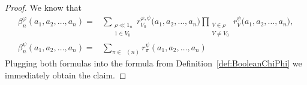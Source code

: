 \documentclass[12pt]{amsart}
\DeclareMathOperator{\IntPart}{\mathit{Int}}
\DeclareMathOperator{\NC}{\mathit{NC}} %
\DeclareMathOperator{\NCirr}{{\mathit{NC}^\textit{irr}}} %
\theoremstyle{definition}
\numberwithin{equation}{section}
\begin{document}
\begin{proof}
	We know that
	\begin{align*}
		\beta^\varphi_n(a_1,a_2,\ldots,a_n)
		=& \sum_{\substack{
				\rho\ll 1_n   \\
				1\in V_0
		} }
		r_{V_0}^{\varphi,\psi}\bigl(a_1,a_2,\ldots,a_n\bigr)
		\prod_{\substack{
				V\in\rho  \\
				V\neq V_0
		}}
		r_{V}^{\psi}\bigl(a_1,a_2,\ldots,a_n\bigr),
		\\
		\beta_n^{\psi}(a_1,a_2,\dots,a_n) = & \sum_{\pi\in\NCirr(n)}    r_\pi^{\psi}(a_1,a_2,\dots,a_n)
	\end{align*}
	Plugging both formulas into the formula from Definition~\ref{def:BooleanChiPhi} we immediately obtain the claim.

\end{proof}
\end{document}

